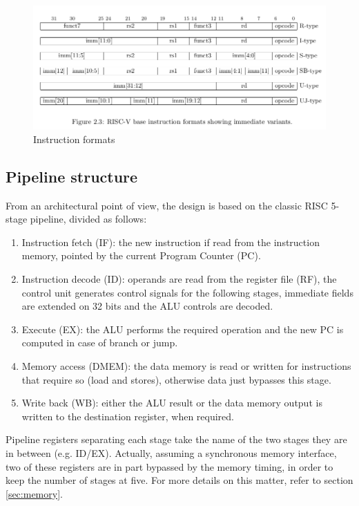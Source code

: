 \documentclass[a4paper]{article}
\begin{document}
\begin{figure}[hbtp]
    \centering
    \includegraphics[width=\textwidth]{img/riscv_instructions_format.png}
    \caption{Instruction formats}
    \label{fig:formats}
\end{figure}

\subsection{Pipeline structure}
From an architectural point of view, the design is based on the classic RISC 5-stage pipeline, divided as follows:
\begin{enumerate}
    \item Instruction fetch (IF): the new instruction if read from the instruction memory, pointed by the current Program Counter (PC).
    \item Instruction decode (ID): operands are read from the register file (RF), the control unit generates control signals for the following stages, immediate fields are extended on 32 bits and the ALU controls are decoded.
    \item Execute (EX): the ALU performs the required operation and the new PC is computed in case of branch or jump.
    \item Memory access (DMEM): the data memory is read or written for instructions that require so (load and stores), otherwise data just bypasses this stage.
    \item Write back (WB): either the ALU result or the data memory output is written to the destination register, when required.
\end{enumerate}

Pipeline registers separating each stage take the name of the two stages they are in between (e.g. ID/EX). Actually, assuming a synchronous memory interface, two of these registers are in part bypassed by the memory timing, in order to keep the number of stages at five. For more details on this matter, refer to section \ref{sec:memory}.
\end{document}
